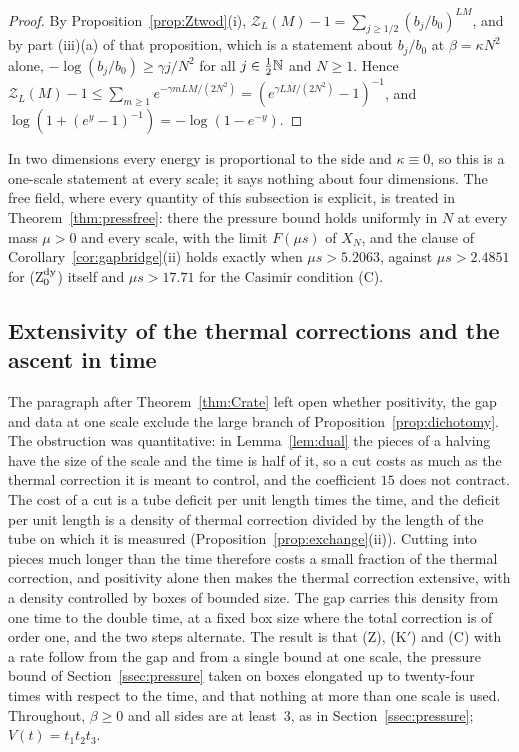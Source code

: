 \begin{proof}
By Proposition~\ref{prop:Ztwod}(i), $\mathcal Z_L(M)-1=\sum_{j\ge1/2}(b_j/b_0)^
{LM}$, and by part (iii)(a) of that proposition, which is a statement about
$b_j/b_0$ at $\beta=\kappa N^2$ alone, $-\log(b_j/b_0)\ge\gamma j/N^2$ for all
$j\in\frac12\mathbb{N}$ and $N\ge1$. Hence $\mathcal Z_L(M)-1\le\sum_{m\ge1}e^{-\gamma
mLM/(2N^2)}=(e^{\gamma LM/(2N^2)}-1)^{-1}$, and $\log(1+(e^y-1)^{-1})=-\log(1-
e^{-y})$.
\end{proof}

In two dimensions every energy is proportional to the side and $\kappa\equiv0$,
so this is a one-scale statement at every scale; it says nothing about four
dimensions. The free field, where every quantity of this subsection is
explicit, is treated in Theorem~\ref{thm:pressfree}: there the pressure bound
holds uniformly in $N$ at every mass $\mu>0$ and every scale, with the limit
$F(\mu s)$ of $X_N$, and the clause of Corollary~\ref{cor:gapbridge}(ii) holds
exactly when $\mu s>5.2063$, against $\mu s>2.4851$ for (Z$_0^{\rm dy}$) itself
and $\mu s>17.71$ for the Casimir condition (C).

\subsection{Extensivity of the thermal corrections and the ascent in time}
\label{ssec:ascent}

The paragraph after Theorem~\ref{thm:Crate} left open whether positivity,
the gap and data at one scale exclude the large branch of
Proposition~\ref{prop:dichotomy}. The obstruction was quantitative: in
Lemma~\ref{lem:dual} the pieces of a halving have the size of the scale and
the time is half of it, so a cut costs as much as the thermal correction it
is meant to control, and the coefficient $15$ does not contract. The cost
of a cut is a tube deficit per unit length times the time, and the deficit
per unit length is a density of thermal correction divided by the length of
the tube on which it is measured (Proposition~\ref{prop:exchange}(ii)).
Cutting into pieces much longer than the time therefore costs a small
fraction of the thermal correction, and positivity alone then makes the
thermal correction extensive, with a density controlled by boxes of bounded
size. The gap carries this density from one time to the double time, at a
fixed box size where the total correction is of order one, and the two steps
alternate. The result is that (Z), (K$'$) and (C) with a rate follow from
the gap and from a single bound at one scale, the pressure bound of
Section~\ref{ssec:pressure} taken on boxes elongated up to twenty-four
times with respect to the time, and that nothing at more than one scale is
used. Throughout, $\beta\ge0$ and all sides are at least~$3$, as in
Section~\ref{ssec:pressure}; $V(t)=t_1t_2t_3$.


